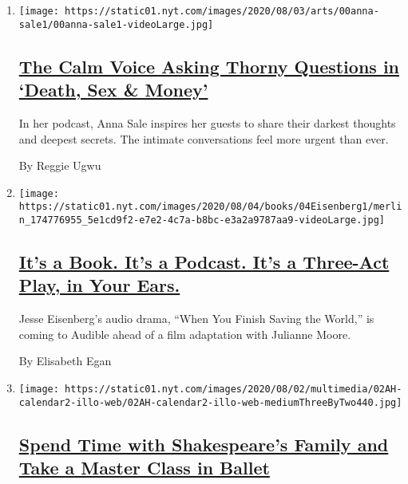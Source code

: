 \begin{enumerate}
\def\labelenumi{\arabic{enumi}.}
\item
  \texttt{[image: https://static01.nyt.com/images/2020/08/03/arts/00anna-sale1/00anna-sale1-videoLarge.jpg]}

  \hypertarget{the-calm-voice-asking-thorny-questions-in-death-sex--money}{%
  \subsection{\texorpdfstring{\href{/2020/08/02/arts/anna-sale-death-sex-money-podcast.html}{The
  Calm Voice Asking Thorny Questions in `Death, Sex \&
  Money'}}{The Calm Voice Asking Thorny Questions in `Death, Sex \& Money'}}\label{the-calm-voice-asking-thorny-questions-in-death-sex--money}}

  In her podcast, Anna Sale inspires her guests to share their darkest
  thoughts and deepest secrets. The intimate conversations feel more
  urgent than ever.

  By Reggie Ugwu
\item
  \texttt{[image: https://static01.nyt.com/images/2020/08/04/books/04Eisenberg1/merlin\_174776955\_5e1cd9f2-e7e2-4c7a-b8bc-e3a2a9787aa9-videoLarge.jpg]}

  \hypertarget{its-a-book-its-a-podcast-its-a-three-act-play-in-your-ears}{%
  \subsection{\texorpdfstring{\href{/2020/08/02/books/jesse-eisenberg-when-you-finish-saving-the-world-audio.html}{It's
  a Book. It's a Podcast. It's a Three-Act Play, in Your
  Ears.}}{It's a Book. It's a Podcast. It's a Three-Act Play, in Your Ears.}}\label{its-a-book-its-a-podcast-its-a-three-act-play-in-your-ears}}

  Jesse Eisenberg's audio drama, ``When You Finish Saving the World,''
  is coming to Audible ahead of a film adaptation with Julianne Moore.

  By Elisabeth Egan
\item
  \texttt{[image: https://static01.nyt.com/images/2020/08/02/multimedia/02AH-calendar2-illo-web/02AH-calendar2-illo-web-mediumThreeByTwo440.jpg]}

  \hypertarget{spend-time-with-shakespeares-family-and-take-a-master-class-in-ballet}{%
  \subsection{\texorpdfstring{\href{/2020/08/01/at-home/coronavirus-things-to-do-this-week.html}{Spend
  Time with Shakespeare's Family and Take a Master Class in
  Ballet}}{Spend Time with Shakespeare's Family and Take a Master Class in Ballet}}\label{spend-time-with-shakespeares-family-and-take-a-master-class-in-ballet}}


\end{enumerate}

